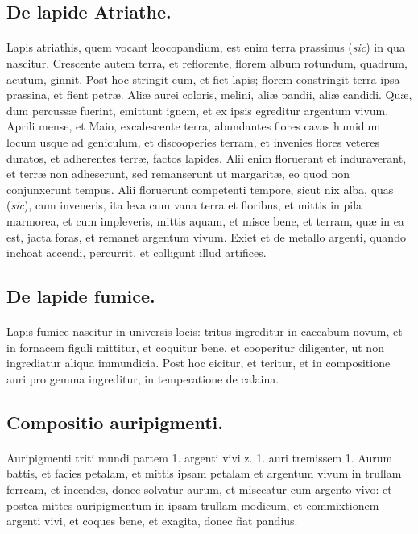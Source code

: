 \documentclass[a4paper, 11pt, oneside, polutonikogreek, italian]{article}
\begin{document}
\subsection{De lapide Atriathe.}
\paragraph{}
Lapis atriathis, quem vocant leocopandium, est enim terra prassinus (\emph{sic}) in qua nascitur. Crescente autem terra, et reflorente, florem album rotundum, quadrum, acutum, ginnit. Post hoc stringit eum, et fiet lapis; florem constringit terra ipsa prassina, et fient petræ. Aliæ aurei coloris, melini, aliæ pandii, aliæ candidi. Quæ, dum percussæ fuerint, emittunt ignem, et ex ipsis egreditur argentum vivum. Aprili mense, et Maio, excalescente terra, abundantes flores cavas humidum locum usque ad geniculum, et discooperies terram, et invenies flores veteres duratos, et adherentes terræ, factos lapides. Alii enim floruerant et induraverant, et terræ non adheserunt, sed remanserunt ut margaritæ, eo quod non conjunxerunt tempus. Alii floruerunt competenti tempore, sicut nix alba, quas (\emph{sic}), cum inveneris, ita leva cum vana terra et floribus, et mittis in pila marmorea, et cum impleveris, mittis aquam, et misce bene, et terram, quæ in ea est, jacta foras, et remanet argentum vivum. Exiet et de metallo argenti, quando inchoat accendi, percurrit, et colligunt illud artifices.

\subsection{De lapide fumice.}
\paragraph{}
Lapis fumice nascitur in universis locis: tritus ingreditur in caccabum novum, et in fornacem figuli mittitur, et coquitur bene, et cooperitur diligenter, ut non ingrediatur aliqua immundicia. Post hoc eicitur, et teritur, et in compositione auri pro gemma ingreditur, in temperatione de calaina.

\subsection{Compositio auripigmenti.}
\paragraph{}
Auripigmenti triti mundi partem 1. argenti vivi z. 1. auri tremissem 1. Aurum battis, et facies petalam, et mittis ipsam petalam et argentum vivum in trullam ferream, et incendes, donec solvatur aurum, et misceatur cum argento vivo: et postea mittes auripigmentum in ipsam trullam modicum, et commixtionem argenti vivi, et coques bene, et exagita, donec fiat pandius.
\end{document}
